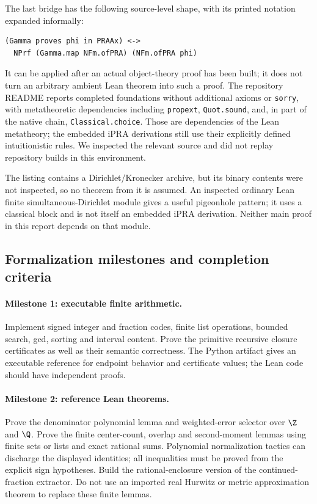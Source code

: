 The last bridge has the following source-level shape, with its printed
notation expanded informally:
\begin{lstlisting}
(Gamma proves phi in PRAAx) <->
  NPrf (Gamma.map NFm.ofPRA) (NFm.ofPRA phi)
\end{lstlisting}
It can be applied after an actual object-theory proof has been built;
it does not turn an arbitrary ambient Lean theorem into such a proof.
The repository README reports completed foundations without additional
axioms or \texttt{sorry}, with metatheoretic dependencies including
\texttt{propext}, \texttt{Quot.sound}, and, in part of the native chain,
\texttt{Classical.choice}.  Those are dependencies of the Lean
metatheory; the embedded iPRA derivations still use their explicitly
defined intuitionistic rules.  We inspected the relevant source and did
not replay repository builds in this environment.

The  listing contains a Dirichlet/Kronecker archive,
but its binary contents were not inspected, so no theorem from it is
assumed.  An inspected ordinary Lean finite simultaneous-Dirichlet
module gives a useful pigeonhole pattern; it uses a classical block and
is not itself an embedded iPRA derivation.  Neither main proof in this
report depends on that module.

\subsection{Formalization milestones and completion criteria}

\paragraph{Milestone 1: executable finite arithmetic.}
Implement signed integer and fraction codes, finite list operations,
bounded search, gcd, sorting and interval content.  Prove the primitive
recursive closure certificates as well as their semantic correctness.
The Python artifact gives an executable reference for endpoint behavior
and certificate values; the Lean code should have independent proofs.

\paragraph{Milestone 2: reference Lean theorems.}
Prove the denominator polynomial lemma and weighted-error selector over
$\Z$ and $\Q$.  Prove the finite center-count, overlap and second-moment
lemmas using finite sets or lists and exact rational sums.  Polynomial
normalization tactics can discharge the displayed identities; all
inequalities must be proved from the explicit sign hypotheses.  Build
the rational-enclosure version of the continued-fraction extractor.
Do not use an imported real Hurwitz or metric approximation theorem to
replace these finite lemmas.

